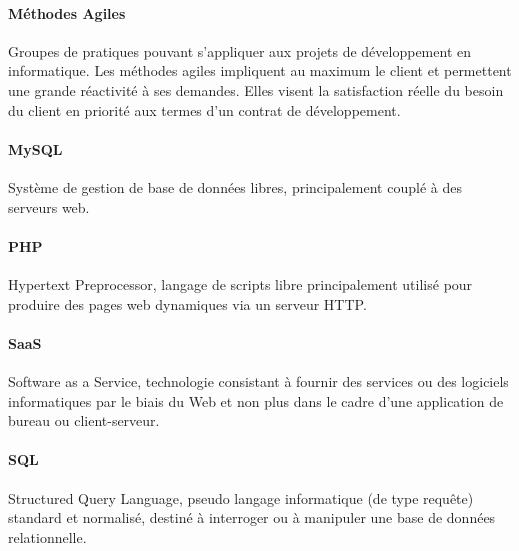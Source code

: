 \paragraph{Méthodes Agiles}
Groupes de pratiques pouvant s'appliquer aux projets de développement en informatique. Les méthodes agiles impliquent au maximum le client et permettent une grande réactivité à ses demandes. Elles visent la satisfaction réelle du besoin du client en priorité aux termes d'un contrat de développement.
\paragraph{MySQL} Système de gestion de base de données libres, principalement couplé à des serveurs web.
\paragraph{PHP} Hypertext Preprocessor, langage de scripts libre principalement utilisé pour
produire des pages web dynamiques via un serveur HTTP.
\paragraph{SaaS} Software as a Service, technologie consistant à fournir des services ou des logiciels informatiques par le biais du Web et non plus dans le cadre d'une application de bureau ou client-serveur.
\paragraph{SQL} Structured Query Language, pseudo
langage informatique (de type requête) standard et normalisé, destiné à interroger ou
à manipuler une base de données relationnelle.




